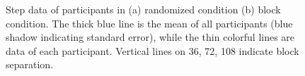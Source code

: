 \begin{figure}[ht]
\centering
{}
\decoRule
\caption[Step data of participants]{Step data of participants in (a) randomized condition (b) block condition. The thick blue line is the mean of all participants (blue shadow indicating standard error), while the thin colorful lines are data of each participant. Vertical lines on 36, 72, 108 indicate block separation. }
\label{fig:Step Participants}
\end{figure}



